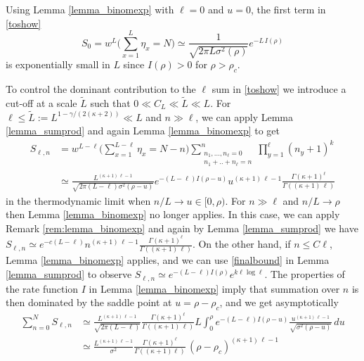 \documentclass[pdflatex,sn-mathphys-num]{sn-jnl}%
\theoremstyle{thmstyleone}%
\theoremstyle{thmstyletwo}%
\theoremstyle{thmstylethree}%
\begin{document}
Using Lemma \ref{lemma_binomexp} with $\ell =0$ and $u=0$, the first term in \eqref{toshow}
\begin{equation}\label{zerorder}
S_0 =w^L \Big(\sum_{x=1}^L \eta_x =N\Big) \simeq \frac{1}{\sqrt{2\pi L\sigma^2 (\rho )}} e^{-L\, I(\rho)} 
\end{equation}
is exponentially small in $L$ since $I(\rho )>0$ for $\rho >\rho_c$.

To control the dominant contribution to the $\ell$ sum in \eqref{toshow} we introduce a cut-off at a scale $\tilde{L}$ such that $0 \ll C_L \ll \tilde{L} \ll L$. For $\ell\leq \tilde L:=L^{1-\gamma /(2(\kappa +2))} \ll L$ and $n \gg \ell$, we can apply Lemma \ref{lemma_sumprod} and again Lemma \ref{lemma_binomexp} to get
\begin{align*}
    S_{\ell ,n} &=w^{L-\ell} \Big(\sum_{x=1}^{L-\ell} \eta_x =N-n\Big)\sum_{\substack{n_1 ,\ldots ,n_\ell =0\\ n_1 +..+n_\ell =n}}^n \prod_{y=1}^\ell  (n_y +1)^k \\
    &\simeq \frac{L^{(\kappa +1)\,\ell-1}}{\sqrt{2\pi (L-\ell )\sigma^2 (\rho -u)}} e^{-(L-\ell )I(\rho -u)} u^{(\kappa +1)\,\ell-1} \frac{\Gamma(\kappa +1)^\ell}{\Gamma((\kappa +1) \, \ell)}
\end{align*}
in the thermodynamic limit when $n/L\to u\in [0,\rho)$. For $n \gg \ell$ and $n/L\to \rho$ then Lemma \ref{lemma_binomexp} no longer applies. In this case, we can apply Remark \ref{rem:lemma_binomexp} and again by Lemma \ref{lemma_sumprod} we have $S_{\ell,n}\simeq e^{-c(L-\ell)}n^{(\kappa +1) \, \ell - 1} \frac{\Gamma(\kappa +1)^\ell}{\Gamma((\kappa +1) \, \ell)}$. On the other hand, if $n \leq C \ell$, Lemma \ref{lemma_binomexp} applies, and we can use \eqref{finalbound} in Lemma \ref{lemma_sumprod} to observe $S_{\ell,n} \simeq e^{-(L-\ell)I(\rho)}e^{k\ell\log \ell}$. 
The properties of the rate function $I$ in Lemma \ref{lemma_binomexp} imply that summation over $n$ is then dominated by the saddle point at $u=\rho -\rho_c$, and we get asymptotically
\begin{align*}
    \sum_{n=0}^N S_{\ell ,n}&\simeq \frac{L^{(\kappa +1)\,\ell-1}}{\sqrt{2\pi (L-\ell )}} \frac{\Gamma(\kappa +1)^\ell}{\Gamma((\kappa +1) \, \ell)}L\int_0^\rho e^{-(L-\ell )I(\rho -u)} \frac{u^{(\kappa +1)\,\ell-1}}{\sqrt{\sigma^2 (\rho -u)}}\, du\\
    &\simeq \frac{L^{(\kappa +1)\,\ell-1}}{\sigma^2} \frac{\Gamma(\kappa +1)^\ell}{\Gamma((\kappa +1)\ell )}\, (\rho -\rho_c )^{(\kappa +1)\,\ell-1}
\end{align*}
\end{document}
